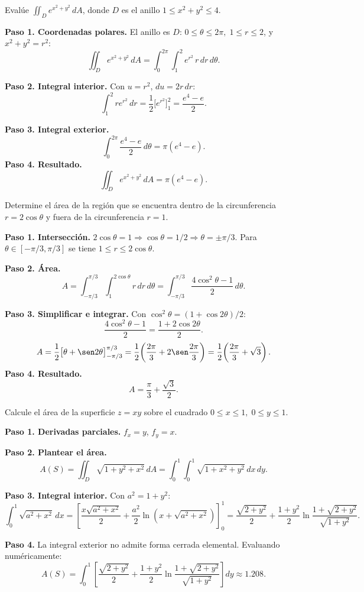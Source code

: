 \begin{prob}
Evalúe \(\displaystyle \iint_D e^{x^2+y^2}\,dA\), donde \(D\) es el anillo \(1\le x^2+y^2\le 4\).
\begin{myproof}
\textbf{Paso 1. Coordenadas polares.} El anillo es $D:\,0\le\theta\le2\pi,\;1\le r\le2$, y $x^2+y^2=r^2$:
\[
\iint_D e^{x^2+y^2}\,dA=\int_0^{2\pi}\int_1^2 e^{r^2}\,r\,dr\,d\theta.
\]

\textbf{Paso 2. Integral interior.} Con $u=r^2$, $du=2r\,dr$:
\[
\int_1^2 r e^{r^2}\,dr=\frac{1}{2}\bigl[e^{r^2}\bigr]_1^2=\frac{e^4-e}{2}.
\]

\textbf{Paso 3. Integral exterior.}
\[
\int_0^{2\pi}\frac{e^4-e}{2}\,d\theta=\pi(e^4-e).
\]
\textbf{Paso 4. Resultado.}
\[
\boxed{\iint_D e^{x^2+y^2}\,dA=\pi(e^4-e).}
\]
\end{myproof}
\end{prob}

\begin{prob}
Determine el área de la región que se encuentra dentro de la circunferencia \(r=2\cos\theta\) y fuera de la circunferencia \(r=1\).
\begin{myproof}
\textbf{Paso 1. Intersección.} $2\cos\theta=1\Rightarrow\cos\theta=1/2\Rightarrow\theta=\pm\pi/3$. Para $\theta\in[-\pi/3,\pi/3]$ se tiene $1\le r\le2\cos\theta$.

\textbf{Paso 2. Área.}
\[
A=\int_{-\pi/3}^{\pi/3}\int_1^{2\cos\theta}r\,dr\,d\theta
=\int_{-\pi/3}^{\pi/3}\frac{4\cos^2\theta-1}{2}\,d\theta.
\]

\textbf{Paso 3. Simplificar e integrar.} Con $\cos^2\theta=(1+\cos2\theta)/2$:
\[
\frac{4\cos^2\theta-1}{2}=\frac{1+2\cos2\theta}{2}.
\]
\[
A=\frac{1}{2}\bigl[\theta+\sen2\theta\bigr]_{-\pi/3}^{\pi/3}
=\frac{1}{2}\!\left(\frac{2\pi}{3}+2\sen\frac{2\pi}{3}\right)
=\frac{1}{2}\!\left(\frac{2\pi}{3}+\sqrt{3}\right).
\]
\textbf{Paso 4. Resultado.}
\[
\boxed{A=\frac{\pi}{3}+\frac{\sqrt{3}}{2}.}
\]
\end{myproof}
\end{prob}

\begin{prob}
Calcule el área de la superficie \(z=xy\) sobre el cuadrado \(0\le x\le 1,\;0\le y\le 1\).
\begin{myproof}
\textbf{Paso 1. Derivadas parciales.} $f_x=y$, $f_y=x$.

\textbf{Paso 2. Plantear el área.}
\[
A(S)=\iint_D\sqrt{1+y^2+x^2}\,dA=\int_0^1\int_0^1\sqrt{1+x^2+y^2}\,dx\,dy.
\]

\textbf{Paso 3. Integral interior.} Con $a^2=1+y^2$:
\[
\int_0^1\sqrt{a^2+x^2}\,dx=\left[\frac{x\sqrt{a^2+x^2}}{2}+\frac{a^2}{2}\ln\!\left(x+\sqrt{a^2+x^2}\right)\right]_0^1
=\frac{\sqrt{2+y^2}}{2}+\frac{1+y^2}{2}\ln\frac{1+\sqrt{2+y^2}}{\sqrt{1+y^2}}.
\]

\textbf{Paso 4.} La integral exterior no admite forma cerrada elemental. Evaluando numéricamente:
\[
\boxed{A(S)=\int_0^1\!\left[\frac{\sqrt{2+y^2}}{2}+\frac{1+y^2}{2}\ln\frac{1+\sqrt{2+y^2}}{\sqrt{1+y^2}}\right]dy\approx 1.208.}
\]
\end{myproof}
\end{prob}

